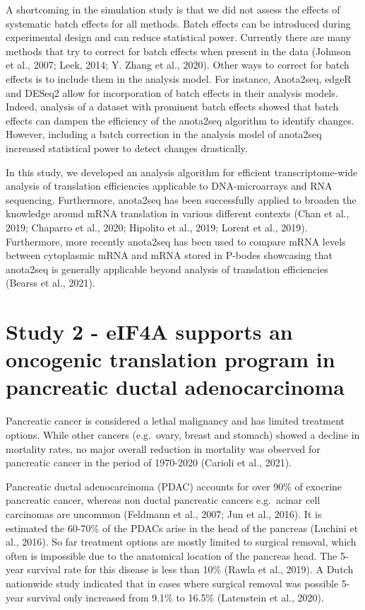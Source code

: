 \documentclass[
  12pt,
  openany]{book}
\begin{document}
A shortcoming in the simulation study is that we did not assess the effects of systematic batch effects for all methods. Batch effects can be introduced during experimental design and can reduce statistical power. Currently there are many methods that try to correct for batch effects when present in the data (Johnson et al., 2007; Leek, 2014; Y. Zhang et al., 2020). Other ways to correct for batch effects is to include them in the analysis model. For instance, Anota2seq, edgeR and DESeq2 allow for incorporation of batch effects in their analysis models. Indeed, analysis of a dataset with prominent batch effects showed that batch effects can dampen the efficiency of the anota2seq algorithm to identify changes. However, including a batch correction in the analysis model of anota2seq increased statistical power to detect changes drastically.

In this study, we developed an analysis algorithm for efficient transcriptome-wide analysis of translation efficiencies applicable to DNA-microarrays and RNA sequencing. Furthermore, anota2seq has been successfully applied to broaden the knowledge around mRNA translation in various different contexts (Chan et al., 2019; Chaparro et al., 2020; Hipolito et al., 2019; Lorent et al., 2019). Furthermore, more recently anota2seq has been used to compare mRNA levels between cytoplasmic mRNA and mRNA stored in P-bodes showcasing that anota2seq is generally applicable beyond analysis of translation efficiencies (Bearss et al., 2021).
\newline

\section{Study 2 - eIF4A supports an oncogenic translation program in pancreatic ductal adenocarcinoma}

Pancreatic cancer is considered a lethal malignancy and has limited treatment options. While other cancers (e.g.~ovary, breast and stomach) showed a decline in mortality rates, no major overall reduction in mortality was observed for pancreatic cancer in the period of 1970-2020 (Carioli et al., 2021).

Pancreatic ductal adenocarcinoma (PDAC) accounts for over 90\% of exocrine pancreatic cancer, whereas non ductal pancreatic cancers e.g.~acinar cell carcinomas are uncommon (Feldmann et al., 2007; Jun et al., 2016). It is estimated the 60-70\% of the PDACs arise in the head of the pancreas (Luchini et al., 2016). So far treatment options are mostly limited to surgical removal, which often is impossible due to the anatomical location of the pancreas head. The 5-year survival rate for this disease is less than 10\% (Rawla et al., 2019). A Dutch nationwide study indicated that in cases where surgical removal was possible 5-year survival only increased from 9.1\% to 16.5\% (Latenstein et al., 2020).
\end{document}
